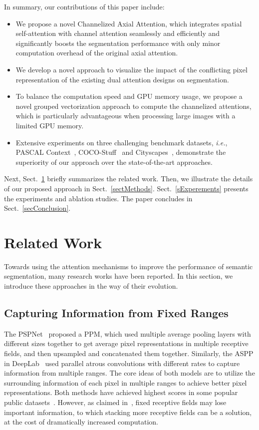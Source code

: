 \documentclass[journal]{IEEEtran}
\begin{document}
In summary, our contributions of this paper include:
\begin{itemize}
\item We propose a novel Channelized Axial Attention, which integrates spatial self-attention with channel attention seamlessly and efficiently and significantly boosts the segmentation performance with only minor computation overhead of the original axial attention. 
\item We develop a novel approach to visualize the impact of the conflicting pixel representation of the existing dual attention designs on segmentation.
\item To balance the computation speed and GPU memory usage, we propose a novel grouped vectorization approach to compute the channelized attentions, which is particularly advantageous when processing large images with a limited GPU memory.
	
	\item Extensive experiments on three challenging benchmark datasets, \textit{i.e.}, PASCAL Context~\cite{cPascalVOC}, COCO-Stuff~\cite{cCocoStuff} and Cityscapes~\cite{cCityScapes}, demonstrate the superiority of our approach over the state-of-the-art approaches.
\end{itemize}

Next,  
Sect.~\ref{sRelatedWorks} briefly summarizes the related work. 
Then, we illustrate the details of our proposed approach in Sect.~\ref{sectMethods}. 
Sect.~\ref{sExperements} presents the experiments and ablation studies. 
The paper concludes in Sect.~\ref{secConclusion}.



\section{Related Work}
\label {sRelatedWorks}

Towards using the attention mechanisms to improve the performance of semantic segmentation, many research works have been reported. In this section, we introduce these approaches in the way of their evolution. 

\subsection{Capturing Information from Fixed Ranges}

The PSPNet~\cite{cPSPNet} proposed a PPM, which used multiple average pooling layers with different sizes together to get average pixel representations in multiple receptive fields, and then upsampled and concatenated them together. 
Similarly, the ASPP in DeepLab~\cite{cDeepLab,cDeepLabV3Plus} used parallel atrous convolutions with different rates to capture information from multiple ranges. 
The core ideas of both models are to utilize the surrounding information of each pixel in multiple ranges to achieve better pixel representations. 
Both methods have achieved highest scores in some popular public datasets~\cite{cPascalVOC, cCityScapes}. 
However, as claimed in~\cite{cDenseASPP}, fixed receptive fields may lose important information, to which stacking more receptive fields can be a solution, at the cost of dramatically increased computation.
\end{document}
